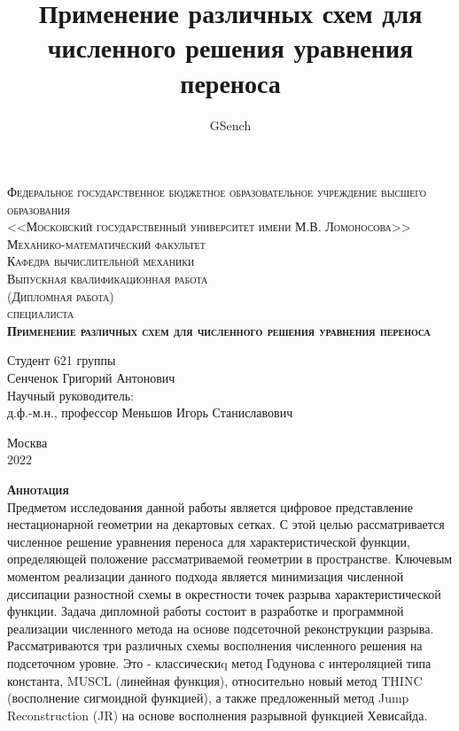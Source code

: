 \documentclass[12pt,a4paper]{article}
\author{GSench}
\title{Применение различных схем для численного решения уравнения переноса}
\begin{document}
\begin{titlepage}

\begin{center}
\textsc{Федеральное государственное бюджетное образовательное учреждение высшего образования\\
<<Московский государственный университет имени М.В. Ломоносова>>}\\
\vspace{12pt}
\textsc{Механико-математический факультет}\\
\textsc{Кафедра вычислительной механики}\\

\vspace*{\fill}
\textsc{Выпускная квалификационная работа\\
(Дипломная работа)\\
специалиста}\\
\vspace{12pt}
\textsc{\textbf{Применение различных схем для численного решения уравнения переноса}}\\
\vspace*{\fill}

\end{center}

\begin{flushright}
Студент 621 группы \\
Сенченок Григорий Антонович\\
\vspace{10pt}
Научный руководитель: \\
д.ф.-м.н., профессор Меньшов Игорь Станиславович
\end{flushright}

\mbox{}
\vfill
\begin{center}
Москва\\[5pt]
2022
\end{center}

\end{titlepage}

\newpage
\textsc{\textbf{Аннотация}}\\
Предметом исследования данной работы является цифровое представление нестационарной геометрии на декартовых сетках.
С этой целью рассматривается численное решение уравнения переноса для характеристической функции, определяющей положение рассматриваемой геометрии в пространстве. Ключевым моментом реализации данного подхода является минимизация численной диссипации разностной схемы в окрестности точек разрыва характеристической функции.
Задача дипломной работы состоит в разработке и программной реализации численного метода на основе подсеточной реконструкции разрыва. Рассматриваются три различных схемы восполнения численного решения на подсеточном уровне. Это -  классическиq метод Годунова с интероляцией типа константа, MUSCL (линейная функция), относительно новый метод THINC (восполнение сигмоидной функцией), а также предложенный метод Jump Reconstruction (JR) на основе восполнения разрывной функцией Хевисайда.
\end{document}
